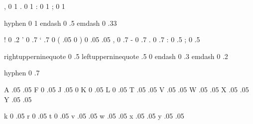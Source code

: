 

\startfonthandling [pure]

   , 0 1
   . 0 1
   : 0 1
   ; 0 1

   hyphen 0 1
   endash 0 .5 
   emdash 0 .33 %

\stopfonthandling

\startfonthandling [punctuation]

   !  0  .2
   '  0  .7
   ` .7   0
   ( .05  0   
   )  0  .05
    .05
   ,  0  .7
   -  0  .7
   .  0  .7
   :  0  .5
   ;  0  .5

   rightupperninequote  0 .5
   leftupperninequote  .5  0 
   endash               0 .3  
   emdash               0 .2  

   hyphen               0 .7

\stopfonthandling

\startfonthandling [alpha]

   A .05 .05
   F  0  .05
   J .05   0
   K  0  .05  
   L  0  .05
   T .05 .05
   V .05 .05
   W .05 .05
   X .05 .05
   Y .05 .05
  
   k  0  .05 
   r  0  .05
   t  0  .05 
   v .05 .05
   w .05 .05
   x .05 .05
   y .05 .05

